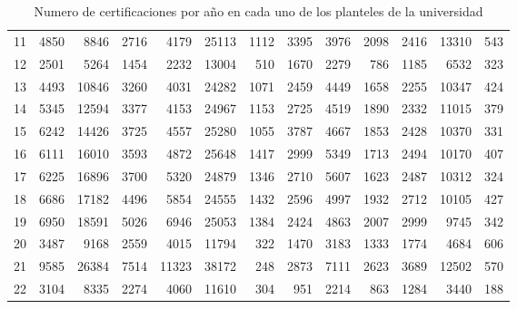 \documentclass[12pt]{article}
\begin{document}
\begin{table}[ht]
{\begin{tabular}{||c||rrrrrr||rrrrrr||}
  11 & 4850 & 8846 & 2716 & 4179& 25113 &  1112& 3395 & 3976 & 2098 & 2416 &13310  &  543\\
  12 & 2501 & 5264 & 1454 & 2232& 13004  &  510& 1670 & 2279 &  786 & 1185 & 6532  &  323\\
  13 & 4493 &10846 & 3260 & 4031& 24282  & 1071& 2459 & 4449 & 1658 & 2255 &10347  &  424\\
  14 & 5345 &12594 & 3377 & 4153& 24967  & 1153& 2725 & 4519 & 1890 & 2332 &11015  &  379\\
  15 & 6242 &14426 & 3725 & 4557& 25280  & 1055& 3787 & 4667 & 1853 & 2428 &10370  &  331\\
  16 & 6111 &16010 & 3593 & 4872& 25648  & 1417& 2999 & 5349 & 1713 & 2494 &10170  &  407\\
  17 & 6225 &16896 & 3700 & 5320& 24879  & 1346& 2710 & 5607 & 1623 & 2487 &10312  &  324\\
  18 & 6686 &17182 & 4496 & 5854& 24555  & 1432& 2596 & 4997 & 1932 & 2712 &10105  &  427\\
  19 & 6950 &18591 & 5026 & 6946& 25053  & 1384& 2424 & 4863 & 2007 & 2999 & 9745  &  342\\
  20 & 3487 & 9168 & 2559 & 4015& 11794  &  322& 1470 & 3183 & 1333 & 1774 & 4684  &  606\\
  21 & 9585 &26384 & 7514 &11323& 38172  &  248& 2873 & 7111 & 2623 & 3689 &12502  &  570\\
  22 & 3104 & 8335 & 2274 & 4060& 11610  &  304&  951 & 2214 &  863 & 1284 & 3440  &  188\\\hline\hline
\end{tabular}}
\caption{Numero de certificaciones por a\~no en cada uno de los planteles de la universidad}
\label{Tabla_Certificaciones_Plantel_Anho}
\end{table}
\end{document}
